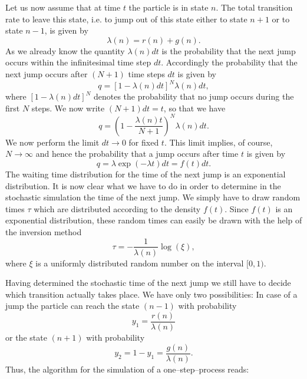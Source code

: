 Let us now assume that at time $t$ the particle is in state
$n$. The total transition rate to leave this state, i.e. to jump 
out of this state either to state $n+1$ or to state $n-1$, is 
given by
\begin{equation}
\label{TOTAL_RATE_ONE_JUMP}
\lambda(n) = r(n) + g(n).
\end{equation}
As we already know  the quantity $\lambda(n) dt$ is the 
probability that the next jump occurs within the infinitesimal 
time step $dt$. Accordingly the probability that the next jump 
occurs after $(N+1)$ time steps $dt$ is given by
\begin{equation*}
q=[1-\lambda(n)dt]^N \lambda(n)dt,
\end{equation*}
where $[1-\lambda(n)dt]^N$ denotes the probability that no jump
occurs during the first $N$ steps. We now write $(N+1)dt =t$, so 
that we have
\begin{equation*}
q= \left( 1 - \frac{\lambda(n) t}{N+1}\right)^N \lambda(n) dt.
\end{equation*}
We now perform the limit $dt \rightarrow 0$ for fixed $t$. This 
limit implies, of course, $N \rightarrow \infty$ and hence the 
probability that a jump occurs after time $t$ is given by
\begin{equation*}
q= \lambda \exp(-\lambda t) dt = f(t) dt.
\end{equation*}
The waiting time distribution for the time of the next jump is an
exponential distribution.
It is now clear what we have to do in order to determine in the
stochastic simulation the time 
of the next jump.  We simply have to draw random times $\tau$ 
which are distributed according to the density $f(t)$. Since $f(t)$
is an exponential distribution, these random times can easily be 
drawn with the help of the inversion method
\begin{equation}
\label{TAU_ONE_STEP}
\tau = - \frac{1}{\lambda(n)} \log(\xi),
\end{equation}
where $\xi$ is a uniformly distributed random number on the 
interval $[0,1)$. 

Having determined the stochastic time of the
next jump we still have to decide which transition actually takes 
place. We have only two possibilities: In case of a jump the 
particle can reach the state $(n-1)$ with probability
\begin{equation*}
y_1 = \frac{r(n)}{\lambda(n)}
\end{equation*}
or the state  $(n+1)$ with probability
\begin{equation}
y_2 = 1 -y_1 = \frac{g(n)}{\lambda(n)}.
\end{equation}
Thus, the algorithm for the simulation of a one--step--process
reads: \\

